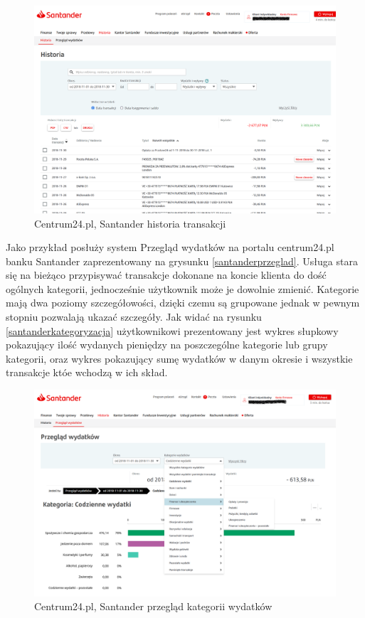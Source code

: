 \documentclass[a4paper,10pt, twoside]{report}
\begin{document}
\begin{large}
\begin{figure}[H]           %
    \centering
    \includegraphics[width=12cm]{figures/Santander_PrzegladWydatkow_historia.png}
    \caption{Centrum24.pl, Santander historia transakcji}
    \label{fig:santanderhistoria}
\end{figure}

{Jako przykład posłuży system Przegląd wydatków na portalu centrum24.pl banku 
Santander zaprezentowany na grysunku \ref{santanderprzeglad}. Usługa stara się 
na bieżąco przypisywać transakcje dokonane na koncie klienta do dość ogólnych 
kategorii, jednocześnie użytkownik może je dowolnie zmienić. Kategorie mają dwa 
poziomy szczegółowości, dzięki czemu są grupowane jednak w pewnym stopniu 
pozwalają ukazać szczegóły. Jak widać na rysunku \ref{santanderkategoryzacja} 
użytkownikowi prezentowany jest wykres słupkowy pokazujący ilość wydanych 
pieniędzy na poszczególne kategorie lub grupy kategorii, oraz wykres pokazujący 
sumę wydatków w danym okresie i wszystkie transakcje któe wchodzą w ich skład.}

\begin{figure}[H]           %
    \centering
    \includegraphics[width=12cm]{figures/Santander_PrzegladWydatkow_przeglad_kategoria.png}
    \caption{Centrum24.pl, Santander przegląd kategorii wydatków}
    \label{fig:santanderprzegladkategoria}


\end{figure}
\end{large}
\end{document}
